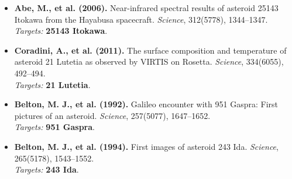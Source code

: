 \documentclass[11pt,letterpaper]{article}
\begin{document}
\begin{itemize}
    \item \textbf{Abe, M., et al. (2006).} Near-infrared spectral results of asteroid 25143 Itokawa from the Hayabusa spacecraft. \textit{Science}, 312(5778), 1344--1347. \\
    \textit{Targets:} \textbf{25143 Itokawa}.
    
    \item \textbf{Coradini, A., et al. (2011).} The surface composition and temperature of asteroid 21 Lutetia as observed by VIRTIS on Rosetta. \textit{Science}, 334(6055), 492--494. \\
    \textit{Targets:} \textbf{21 Lutetia}.
    
    \item \textbf{Belton, M. J., et al. (1992).} Galileo encounter with 951 Gaspra: First pictures of an asteroid. \textit{Science}, 257(5077), 1647--1652. \\
    \textit{Targets:} \textbf{951 Gaspra}.
    
    \item \textbf{Belton, M. J., et al. (1994).} First images of asteroid 243 Ida. \textit{Science}, 265(5178), 1543--1552. \\
    \textit{Targets:} \textbf{243 Ida}.
\end{itemize}
\end{document}
